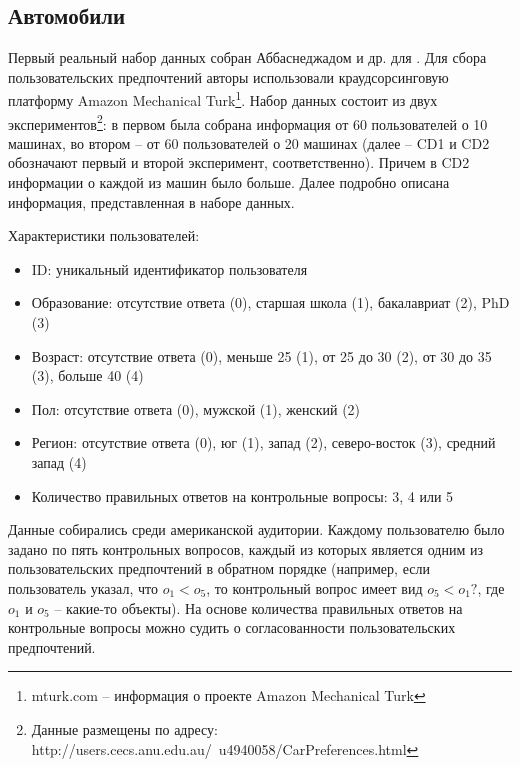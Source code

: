 	
	\subsection{Автомобили}
		Первый реальный набор данных собран Аббаснеджадом и др. для \cite{dataset:Abbasnejad:2013}. Для сбора пользовательских предпочтений авторы использовали краудсорсинговую платформу Amazon Mechanical Turk\footnote{mturk.com – информация о проекте Amazon Mechanical Turk}. Набор данных состоит из двух экспериментов\footnote{Данные размещены по адресу: http://users.cecs.anu.edu.au/~u4940058/CarPreferences.html}: в первом была собрана информация от 60 пользователей о 10 машинах, во втором – от 60 пользователей о 20 машинах (далее – CD1 и CD2 обозначают первый и второй эксперимент, соответственно). Причем в CD2 информации о каждой из машин было больше. Далее подробно описана информация, представленная в наборе данных.
		
		\vspace{1em}
		
		\noindent Характеристики пользователей:
		\vspace{-0.7em}
		\begin{itemize}[itemsep=-1.5mm]
			\item ID: уникальный идентификатор пользователя
			\item Образование: отсутствие ответа (0), старшая школа (1), бакалавриат (2), PhD (3)
			\item Возраст: отсутствие ответа (0), меньше 25 (1), от 25 до 30 (2), от 30 до 35 (3), больше 40 (4)
			\item Пол: отсутствие ответа (0), мужской (1), женский (2)
			\item Регион: отсутствие ответа (0), юг (1), запад (2), северо-восток (3), средний запад (4)
			\item Количество правильных ответов на контрольные вопросы: 3, 4 или 5
		\end{itemize}
		Данные собирались среди американской аудитории. Каждому пользователю было задано по пять контрольных вопросов, каждый из которых является одним из пользовательских предпочтений в обратном порядке (например, если пользователь указал, что $o_1 < o_5$, то контрольный вопрос имеет вид $o_5 < o_1?$, где $o_1$ и $o_5$ – какие-то объекты). На основе количества правильных ответов на контрольные вопросы можно судить о согласованности пользовательских предпочтений.
		
